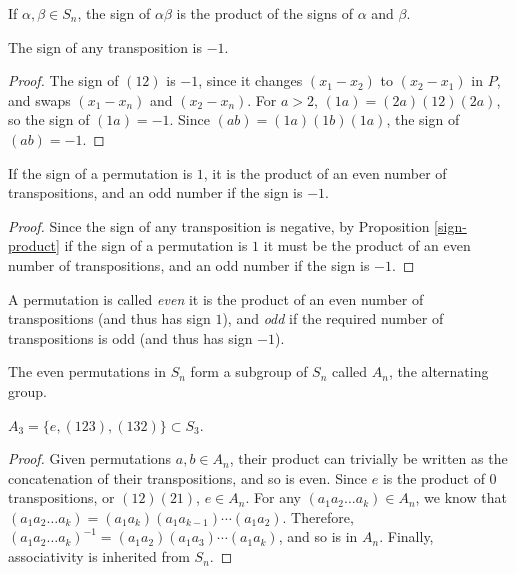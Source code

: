 \begin{prop}\label{sign-product}
    If $\alpha, \beta \in S_n$, the sign of $\alpha\beta$ is the product of the signs of $\alpha$ and $\beta$.
\end{prop}

\begin{prop}
    The sign of any transposition is $-1$.
\end{prop}

\begin{proof}\label{transposition-sign-is-negative}
    The sign of $(12)$ is $-1$, since it changes $(x_1 - x_2)$ to $(x_2 - x_1)$ in $P$, and swaps $(x_1 - x_n)$ and $(x_2 - x_n)$. For $a > 2$, $(1a) = (2a)(12)(2a)$, so the sign of $(1a) = -1$. Since $(ab) = (1a)(1b)(1a)$, the sign of $(ab) = -1$.
\end{proof}

\begin{prop}
    If the sign of a permutation is $1$, it is the product of an even number of transpositions, and an odd number if the sign is $-1$.
\end{prop}

\begin{proof}
    Since the sign of any transposition is negative, by Proposition \ref{sign-product} if the sign of a permutation is $1$ it must be the product of an even number of transpositions, and an odd number if the sign is $-1$.
\end{proof}

\begin{defn}
    A permutation is called \emph{even} it is the product of an even number of transpositions (and thus has sign $1$), and \emph{odd} if the required number of transpositions is odd (and thus has sign $-1$).
\end{defn}

\begin{thm}
    The even permutations in $S_n$ form a subgroup of $S_n$ called $A_n$, the alternating group.
\end{thm}

\begin{exmp}
    $A_3 = \{e, (123), (132)\} \subset S_3$.
\end{exmp}

\begin{proof}
    Given permutations $a, b \in A_n$, their product can trivially be written as the concatenation of their transpositions, and so is even. Since $e$ is the product of $0$ transpositions, or $(12)(21)$, $e \in A_n$. For any $(a_1a_2\ldots a_k) \in A_n$, we know that $(a_1a_2\ldots a_k) = (a_1a_k)(a_1a_{k-1})\cdots(a_1a_2)$. Therefore, $(a_1a_2\ldots a_k)^{-1} = (a_1a_2)(a_1a_3)\cdots(a_1a_k)$, and so is in $A_n$. Finally, associativity is inherited from $S_n$.
\end{proof}

